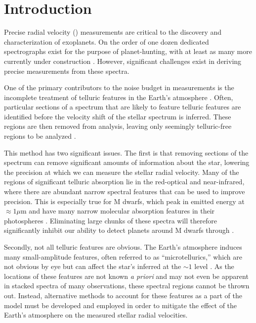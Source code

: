 \documentclass[modern]{aastex62}
\begin{document}

\section{Introduction}

Precise radial velocity (\RV) measurements are critical to the discovery and characterization of exoplanets.
On the order of one dozen dedicated spectrographs exist for the purpose of \RV planet-hunting, with at least as many more currently under construction \citep{Wright2017}.
However, significant challenges exist in deriving precise \RV measurements from these spectra.

One of the primary contributors to the noise budget in \RV measurements is the incomplete treatment of telluric features in the
Earth's atmosphere \citep{Halverson2016}.
Often, particular sections of a spectrum that are likely to feature telluric features are identified before the velocity shift of the stellar spectrum is inferred.
These regions are then removed from analysis, leaving only seemingly telluric-free regions to be analyzed \citep[e.g.][]{AngladaEscude2012}.

This method has two significant issues.
The first is that removing sections of the spectrum can remove significant amounts of information about the star, lowering the precision at which we can measure the stellar radial velocity.
Many of the regions of significant telluric absorption lie in the red-optical and near-infrared, where there are abundant narrow spectral features that can be used to improve \RV precision.
This is especially true for M dwarfs, which peak in emitted energy at $\approx 1 \mu$m and have many narrow molecular absorption features in their photospheres \citep{Figueira2016}.
Eliminating large chunks of these spectra will therefore significantly inhibit our ability to detect planets around M dwarfs through \RVs.

Secondly, not all telluric features are obvious.
The Earth's atmosphere induces many small-amplitude features, often referred to as ``microtellurics,'' which are not obvious by eye but can affect the star's inferred \RV at the $\sim 1$ \ms level \citep{Cunha2014}.
As the locations of these features are not known \textit{a priori} and may not even be apparent in stacked spectra of many observations, these spectral regions cannot be thrown out.
Instead, alternative methods to account for these features as a part of the model must be developed and employed in order to mitigate the effect of the Earth's atmosphere on the measured stellar radial velocities.
\end{document}
